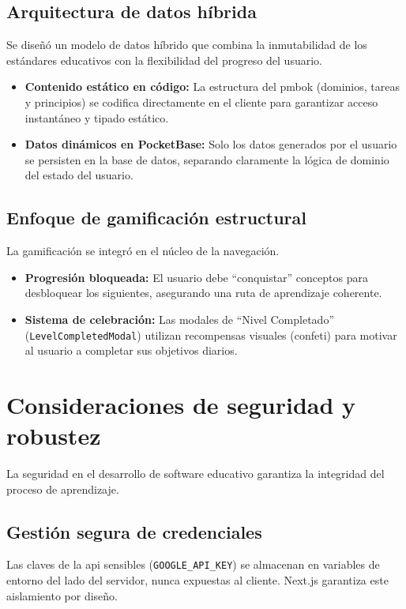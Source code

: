 \subsection{Arquitectura de datos híbrida}
Se diseñó un modelo de datos híbrido que combina la inmutabilidad de los estándares educativos con la flexibilidad del progreso del usuario.

\begin{itemize}
\item \textbf{Contenido estático en código:} La estructura del \gls{pmbok} (dominios, tareas y principios) se codifica directamente en el cliente para garantizar acceso instantáneo y tipado estático.
\item \textbf{Datos dinámicos en PocketBase:} Solo los datos generados por el usuario se persisten en la base de datos, separando claramente la lógica de dominio del estado del usuario.

\end{itemize}
\subsection{Enfoque de gamificación estructural}
La gamificación se integró en el núcleo de la navegación.

\begin{itemize}
\item \textbf{Progresión bloqueada:} El usuario debe ``conquistar'' conceptos para desbloquear los siguientes, asegurando una ruta de aprendizaje coherente.
\item \textbf{Sistema de celebración:} Las modales de ``Nivel Completado'' (\texttt{LevelCompletedModal}) utilizan recompensas visuales (confeti) para motivar al usuario a completar sus objetivos diarios.

\end{itemize}
\section{Consideraciones de seguridad y robustez}

La seguridad en el desarrollo de software educativo garantiza la integridad del proceso de aprendizaje.

\subsection{Gestión segura de credenciales}
Las claves de la \gls{api} sensibles (\texttt{GOOGLE\_API\_KEY}) se almacenan en variables de entorno del lado del servidor, nunca expuestas al cliente. Next.js garantiza este aislamiento por diseño.

